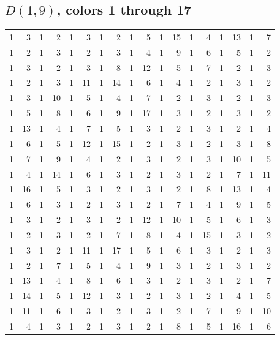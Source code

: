 \documentclass[11pt,reqno]{amsart}
\theoremstyle{plain}
\newcommand{\D}[1]{D(1,#1)}
\theoremstyle{plain}
\theoremstyle{plain}
\begin{document}
\clearpage
\subsection*{\texorpdfstring{$\D{9}$}{D(1,9)}, colors 1 through 17}

\begin{center}\footnotesize
\setlength{\tabcolsep}{3pt}
\begin{tabular}{rrrrrrrrrrrrrrrrrr}
 1 &  3 &  1 &  2 &  1 &  3 &  1 &  2 &  1 &  5 &  1 & 15 &  1 &  4 &  1 & 13 &  1 &  7 \\
 1 &  2 &  1 &  3 &  1 &  2 &  1 &  3 &  1 &  4 &  1 &  9 &  1 &  6 &  1 &  5 &  1 &  2 \\
 1 &  3 &  1 &  2 &  1 &  3 &  1 &  8 &  1 & 12 &  1 &  5 &  1 &  7 &  1 &  2 &  1 &  3 \\
 1 &  2 &  1 &  3 &  1 & 11 &  1 & 14 &  1 &  6 &  1 &  4 &  1 &  2 &  1 &  3 &  1 &  2 \\
 1 &  3 &  1 & 10 &  1 &  5 &  1 &  4 &  1 &  7 &  1 &  2 &  1 &  3 &  1 &  2 &  1 &  3 \\
 1 &  5 &  1 &  8 &  1 &  6 &  1 &  9 &  1 & 17 &  1 &  3 &  1 &  2 &  1 &  3 &  1 &  2 \\
 1 & 13 &  1 &  4 &  1 &  7 &  1 &  5 &  1 &  3 &  1 &  2 &  1 &  3 &  1 &  2 &  1 &  4 \\
 1 &  6 &  1 &  5 &  1 & 12 &  1 & 15 &  1 &  2 &  1 &  3 &  1 &  2 &  1 &  3 &  1 &  8 \\
 1 &  7 &  1 &  9 &  1 &  4 &  1 &  2 &  1 &  3 &  1 &  2 &  1 &  3 &  1 & 10 &  1 &  5 \\
 1 &  4 &  1 & 14 &  1 &  6 &  1 &  3 &  1 &  2 &  1 &  3 &  1 &  2 &  1 &  7 &  1 & 11 \\
 1 & 16 &  1 &  5 &  1 &  3 &  1 &  2 &  1 &  3 &  1 &  2 &  1 &  8 &  1 & 13 &  1 &  4 \\
 1 &  6 &  1 &  3 &  1 &  2 &  1 &  3 &  1 &  2 &  1 &  7 &  1 &  4 &  1 &  9 &  1 &  5 \\
 1 &  3 &  1 &  2 &  1 &  3 &  1 &  2 &  1 & 12 &  1 & 10 &  1 &  5 &  1 &  6 &  1 &  3 \\
 1 &  2 &  1 &  3 &  1 &  2 &  1 &  7 &  1 &  8 &  1 &  4 &  1 & 15 &  1 &  3 &  1 &  2 \\
 1 &  3 &  1 &  2 &  1 & 11 &  1 & 17 &  1 &  5 &  1 &  6 &  1 &  3 &  1 &  2 &  1 &  3 \\
 1 &  2 &  1 &  7 &  1 &  5 &  1 &  4 &  1 &  9 &  1 &  3 &  1 &  2 &  1 &  3 &  1 &  2 \\
 1 & 13 &  1 &  4 &  1 &  8 &  1 &  6 &  1 &  3 &  1 &  2 &  1 &  3 &  1 &  2 &  1 &  7 \\
 1 & 14 &  1 &  5 &  1 & 12 &  1 &  3 &  1 &  2 &  1 &  3 &  1 &  2 &  1 &  4 &  1 &  5 \\
 1 & 11 &  1 &  6 &  1 &  3 &  1 &  2 &  1 &  3 &  1 &  2 &  1 &  7 &  1 &  9 &  1 & 10 \\
 1 &  4 &  1 &  3 &  1 &  2 &  1 &  3 &  1 &  2 &  1 &  8 &  1 &  5 &  1 & 16 &  1 &  6 \\
\end{tabular}
\end{center}
\end{document}
